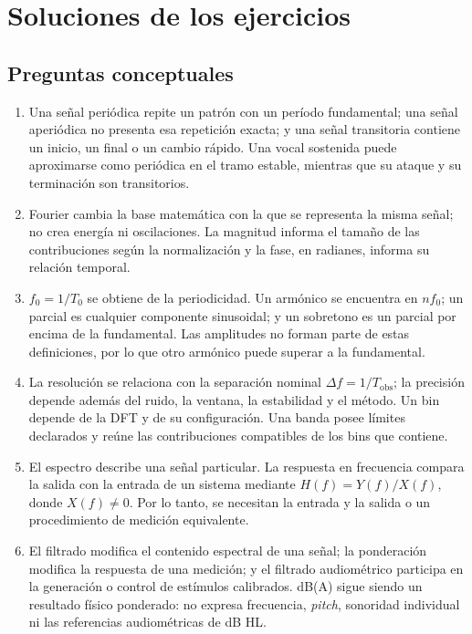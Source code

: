 \section{Soluciones de los ejercicios}
\label{sec:u5-soluciones}

\subsection*{Preguntas conceptuales}

\begin{enumerate}[label=\textbf{C\arabic*.},leftmargin=*]
    \item Una señal periódica repite un patrón con un período fundamental; una
    señal aperiódica no presenta esa repetición exacta; y una señal transitoria
    contiene un inicio, un final o un cambio rápido. Una vocal sostenida puede
    aproximarse como periódica en el tramo estable, mientras que su ataque y su
    terminación son transitorios.

    \item Fourier cambia la base matemática con la que se representa la misma
    señal; no crea energía ni oscilaciones. La magnitud informa el tamaño de
    las contribuciones según la normalización y la fase, en radianes, informa
    su relación temporal.

    \item \(f_0=1/T_0\) se obtiene de la periodicidad. Un armónico se encuentra
    en \(nf_0\); un parcial es cualquier componente sinusoidal; y un sobretono
    es un parcial por encima de la fundamental. Las amplitudes no forman parte
    de estas definiciones, por lo que otro armónico puede superar a la
    fundamental.

    \item La resolución se relaciona con la separación nominal
    \(\Delta f=1/T_\mathrm{obs}\); la precisión depende además del ruido, la
    ventana, la estabilidad y el método. Un bin depende de la DFT y de su
    configuración. Una banda posee límites declarados y reúne las
    contribuciones compatibles de los bins que contiene.

    \item El espectro describe una señal particular. La respuesta en
    frecuencia compara la salida con la entrada de un sistema mediante
    \(H(f)=Y(f)/X(f)\), donde \(X(f)\neq0\). Por lo tanto, se necesitan la
    entrada y la salida o un procedimiento de medición equivalente.

    \item El filtrado modifica el contenido espectral de una señal; la
    ponderación modifica la respuesta de una medición; y el filtrado
    audiométrico participa en la generación o control de estímulos calibrados.
    dB(A) sigue siendo un resultado físico ponderado: no expresa frecuencia,
    \emph{pitch}, sonoridad individual ni las referencias audiométricas de
    dB HL.
\end{enumerate}

